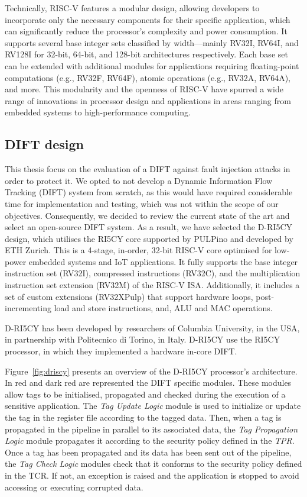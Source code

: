 Technically, RISC-V features a modular design, allowing developers to incorporate only the necessary components for their specific application, which can significantly reduce the processor's complexity and power consumption. It supports several base integer sets classified by width—mainly RV32I, RV64I, and RV128I for 32-bit, 64-bit, and 128-bit architectures respectively. Each base set can be extended with additional modules for applications requiring floating-point computations (e.g., RV32F, RV64F), atomic operations (e.g., RV32A, RV64A), and more. This modularity and the openness of RISC-V have spurred a wide range of innovations in processor design and applications in areas ranging from embedded systems to high-performance computing.

\subsection{DIFT design}
This thesis focus on the evaluation of a DIFT against fault injection attacks in order to protect it. We opted to not develop a Dynamic Information Flow Tracking (DIFT) system from scratch, as this would have required considerable time for implementation and testing, which was not within the scope of our objectives. Consequently, we decided to review the current state of the art and select an open-source DIFT system.
As a result, we have selected the D-RI5CY~\cite{PDGLC-18-hpec, driscy} design, which utilises the RI5CY core supported by PULPino and developed by ETH Zurich. This is a 4-stage, in-order, 32-bit RISC-V core optimised for low-power embedded systems and IoT applications. It fully supports the base integer instruction set (RV32I), compressed instructions (RV32C), and the multiplication instruction set extension (RV32M) of the RISC-V ISA. Additionally, it includes a set of custom extensions (RV32XPulp) that support hardware loops, post-incrementing load and store instructions, and, ALU and MAC operations.

D-RI5CY has been developed by researchers of Columbia University, in the USA, in partnership with Politecnico di Torino, in Italy. D-RI5CY use the RI5CY processor, in which they implemented a hardware in-core DIFT.

Figure~\ref{fig:driscy} presents an overview of the D-RI5CY processor's architecture. In red and dark red are represented the DIFT specific modules.
These modules allow tags to be initialised, propagated and checked during the execution of a sensitive application.
The \textit{Tag Update Logic} module is used to initialize or update the tag in the register file according to the tagged data.
Then, when a tag is propagated in the pipeline in parallel to its associated data, the \textit{Tag Propagation Logic} module propagates it according to the security policy defined in the \textit{TPR}.
Once a tag has been propagated and its data has been sent out of the pipeline, the \textit{Tag Check Logic} modules check that it conforms to the security policy defined in the TCR. If not, an exception is raised and the application is stopped to avoid accessing or executing corrupted data.

